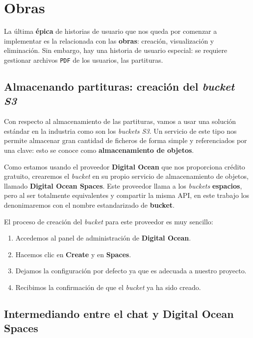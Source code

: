 \section{Obras}

La última \textbf{épica} de historias de usuario que nos queda por comenzar a implementar es la relacionada con las \textbf{obras}: creación, visualización y eliminación. Sin embargo, hay una historia de usuario especial: se requiere gestionar archivos \texttt{PDF} de los usuarios, las partituras.


\subsection{Almacenando partituras: creación del \textit{bucket S3}}\label{subsection:crearBucket}

Con respecto al almacenamiento de las partituras, vamos a usar una solución estándar en la industria como son los \textit{buckets S3}. Un servicio de este tipo nos permite almacenar gran cantidad de ficheros de forma simple y referenciados por una clave: esto se conoce como \textbf{almacenamiento de objetos}. 

Como estamos usando el proveedor \textbf{Digital Ocean} que nos proporciona crédito gratuito, crearemos el \textit{bucket} en su propio servicio de almacenamiento de objetos, llamado \textbf{Digital Ocean Spaces}. Este proveedor llama a los \textit{buckets} \textbf{espacios}, pero al ser totalmente equivalentes y compartir la misma API, en este trabajo los denonimaremos con el nombre estandarizado de \textbf{bucket}.

El proceso de creación del \textit{bucket} para este proveedor es muy sencillo:

\begin{enumerate}
    \item Accedemos al panel de administración de \textbf{Digital Ocean}.
    \item Hacemos clic en \textbf{Create} y en \textbf{Spaces}.
    \item Dejamos la configuración por defecto ya que es adecuada a nuestro proyecto.
    \item Recibimos la confirmación de que el \textit{bucket} ya ha sido creado.
\end{enumerate}

\subsection{Intermediando entre el chat y Digital Ocean Spaces}

